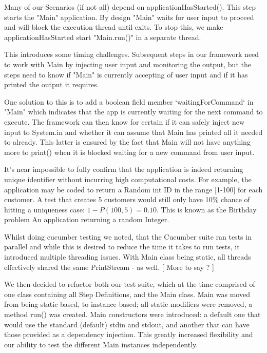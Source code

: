 \documentclass[11pt]{article}
\begin{document}
Many of our Scenarios (if not all) depend on applicationHasStarted(). This step starts the "Main" application. By design "Main" waits for user input to proceed and will block the execution thread until exits. To stop this, we make applicationHasStarted start "Main.run()" in a separate thread. 

This introduces some timing challenges. Subsequent steps in our framework need to work with Main by injecting user input and monitoring the output, but the steps need to know if "Main" is currently accepting of user input and if it has printed the output it requires. 

One solution to this is to add a boolean field member `waitingForCommand` in "Main" which indicates that the app is currently waiting for the next command to execute. The framework can then know for certain if it can safely inject new input to System.in and whether it can assume that Main has printed all it needed to already. This latter is ensured by the fact that Main will not have anything more to print() when it is blocked waiting for a new command from user input. 

It's near impossible to fully confirm that the application is indeed returning unique identifier without incurring high computational costs. For example, the application may be coded to return a Random int ID in the range [1-100] for each customer. A test that creates 5 customers would still only have 10\% chance of hitting a uniqueness case: 
$1 - P(100,5) = 0.10$. This is known as the Birthday problem %
An application returning a random Integer. 

Whilst doing cucumber testing we noted, that the Cucumber suite ran tests in parallel and while this is desired to reduce the time it takes to run tests, it introduced multiple threading issues. With Main class being static, all threads effectively shared the same PrintStream  - as well. [ More to say ? ]

We then decided to refactor both our test suite, which at the time comprised of one class containing all Step Definitions, and the Main class. Main was moved from being static based, to instance based; all static modifiers were removed, a method run() was created. Main constructors were introduced: a default one that would use the standard (default) stdin and stdout, and another that can have those provided as a dependency injection. This greatly increased flexibility and our ability to test the different Main instances independently. 
\end{document}
